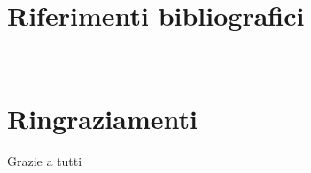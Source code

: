 \documentclass[12pt,a4paper,twoside]{book}
\begin{document}



\renewcommand{\bibsection}{}
\chapter*{Riferimenti bibliografici}

\newpage

\newpage~\newpage
\chapter*{Ringraziamenti}
Grazie a tutti
\end{document}

